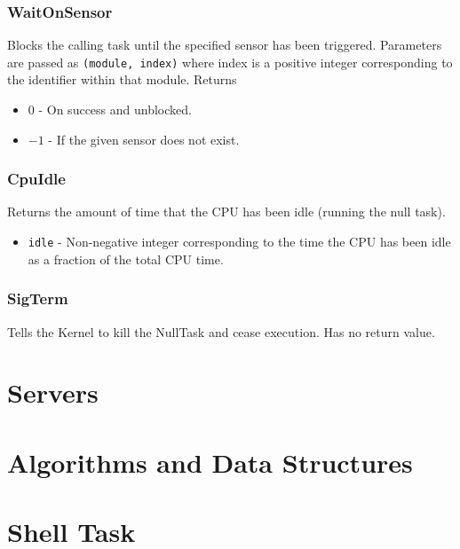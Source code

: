 \documentclass[12pt]{article}
\begin{document}
\subsubsection{WaitOnSensor}
Blocks the calling task until the specified sensor has been triggered.  Parameters are passed as \texttt{(module, index)} where index is a positive integer corresponding to the identifier within that module.  Returns
\begin{itemize}
  \item $0$ - On success and unblocked.
  \item $-1$ - If the given sensor does not exist.
    \\
\end{itemize}
\subsubsection{CpuIdle}
Returns the amount of time that the CPU has been idle (running the null task).
\begin{itemize}
  \item \texttt{idle} - Non-negative integer corresponding to the time the CPU has been idle as a fraction of the total CPU time.
    \\
\end{itemize}
\subsubsection{SigTerm}
Tells the Kernel to kill the NullTask and cease execution.  Has no return value.
\\[2\baselineskip]
\section{Servers}
\section{Algorithms and Data Structures}
\section{Shell Task}
\end{document}

